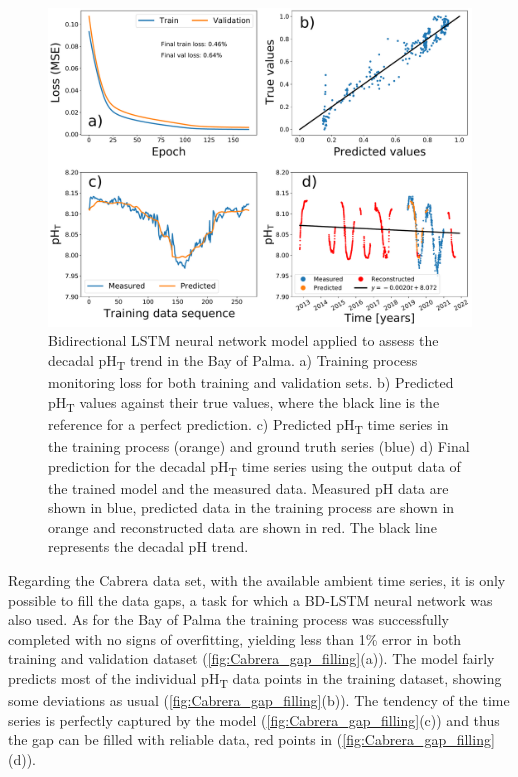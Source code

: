 \begin{figure}[H]
    \centering
    \includegraphics[width=1\textwidth]{Figures/Best_bidirectional_LSTM.pdf}
    \caption[Deep learning model applied to assess the
        decadal pH\textsubscript{T} trend in the Bay of Palma]{Bidirectional
        LSTM neural network model applied to assess the decadal
        pH\textsubscript{T} trend in the Bay of Palma. a) Training process
        monitoring loss for both training and validation sets. b) Predicted
        pH\textsubscript{T} values against their true values, where the black
        line is the reference for a perfect prediction. c) Predicted
        pH\textsubscript{T} time series in the training process (orange) and
        ground truth series (blue) d) Final prediction for the decadal
        pH\textsubscript{T} time series using the output data of the trained
        model and the measured data. Measured pH data are shown in blue,
        predicted data in the training process are shown in orange and
        reconstructed data are shown in red. The black line represents the
        decadal pH trend.}
    \label{fig:best_LSTM}
\end{figure}

Regarding the Cabrera data set, with the available ambient time series, it
is only possible to fill the data gaps, a task for which a BD-LSTM neural
network was also used. As for the Bay of Palma the training process was
successfully completed with no signs of overfitting, yielding less than 1\%
error in both training and validation dataset
(\cref{fig:Cabrera_gap_filling}(a)). The model fairly predicts most of the
individual pH\textsubscript{T} data points in the training dataset, showing
some deviations as usual (\cref{fig:Cabrera_gap_filling}(b)). The tendency of
the time series is perfectly captured by the model
(\cref{fig:Cabrera_gap_filling}(c)) and thus the gap can be filled with
reliable data, red points in (\cref{fig:Cabrera_gap_filling}(d)).

